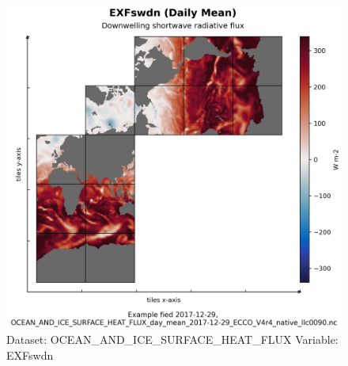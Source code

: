 \begin{figure}[H]
\centering
\includegraphics[scale=0.55]{../images/plots/native_plots/Ocean_and_Sea-Ice_Surface_Heat_Fluxes/EXFswdn.png}
\caption{Dataset: OCEAN\_AND\_ICE\_SURFACE\_HEAT\_FLUX Variable: EXFswdn}
\label{tab:table-OCEAN_AND_ICE_SURFACE_HEAT_FLUX_EXFswdn-Plot}
\end{figure}
\pagebreak
